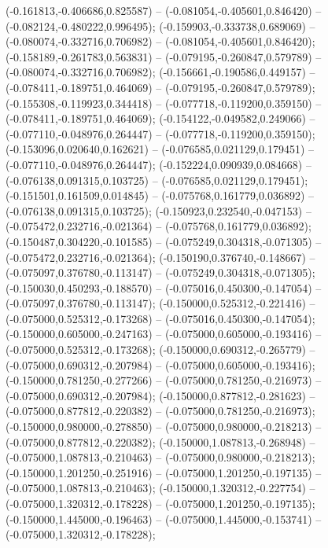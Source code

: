  (-0.161813,-0.406686,0.825587) -- (-0.081054,-0.405601,0.846420) -- (-0.082124,-0.480222,0.996495);
 (-0.159903,-0.333738,0.689069) -- (-0.080074,-0.332716,0.706982) -- (-0.081054,-0.405601,0.846420);
 (-0.158189,-0.261783,0.563831) -- (-0.079195,-0.260847,0.579789) -- (-0.080074,-0.332716,0.706982);
 (-0.156661,-0.190586,0.449157) -- (-0.078411,-0.189751,0.464069) -- (-0.079195,-0.260847,0.579789);
 (-0.155308,-0.119923,0.344418) -- (-0.077718,-0.119200,0.359150) -- (-0.078411,-0.189751,0.464069);
 (-0.154122,-0.049582,0.249066) -- (-0.077110,-0.048976,0.264447) -- (-0.077718,-0.119200,0.359150);
 (-0.153096,0.020640,0.162621) -- (-0.076585,0.021129,0.179451) -- (-0.077110,-0.048976,0.264447);
 (-0.152224,0.090939,0.084668) -- (-0.076138,0.091315,0.103725) -- (-0.076585,0.021129,0.179451);
 (-0.151501,0.161509,0.014845) -- (-0.075768,0.161779,0.036892) -- (-0.076138,0.091315,0.103725);
 (-0.150923,0.232540,-0.047153) -- (-0.075472,0.232716,-0.021364) -- (-0.075768,0.161779,0.036892);
 (-0.150487,0.304220,-0.101585) -- (-0.075249,0.304318,-0.071305) -- (-0.075472,0.232716,-0.021364);
 (-0.150190,0.376740,-0.148667) -- (-0.075097,0.376780,-0.113147) -- (-0.075249,0.304318,-0.071305);
 (-0.150030,0.450293,-0.188570) -- (-0.075016,0.450300,-0.147054) -- (-0.075097,0.376780,-0.113147);
 (-0.150000,0.525312,-0.221416) -- (-0.075000,0.525312,-0.173268) -- (-0.075016,0.450300,-0.147054);
 (-0.150000,0.605000,-0.247163) -- (-0.075000,0.605000,-0.193416) -- (-0.075000,0.525312,-0.173268);
 (-0.150000,0.690312,-0.265779) -- (-0.075000,0.690312,-0.207984) -- (-0.075000,0.605000,-0.193416);
 (-0.150000,0.781250,-0.277266) -- (-0.075000,0.781250,-0.216973) -- (-0.075000,0.690312,-0.207984);
 (-0.150000,0.877812,-0.281623) -- (-0.075000,0.877812,-0.220382) -- (-0.075000,0.781250,-0.216973);
 (-0.150000,0.980000,-0.278850) -- (-0.075000,0.980000,-0.218213) -- (-0.075000,0.877812,-0.220382);
 (-0.150000,1.087813,-0.268948) -- (-0.075000,1.087813,-0.210463) -- (-0.075000,0.980000,-0.218213);
 (-0.150000,1.201250,-0.251916) -- (-0.075000,1.201250,-0.197135) -- (-0.075000,1.087813,-0.210463);
 (-0.150000,1.320312,-0.227754) -- (-0.075000,1.320312,-0.178228) -- (-0.075000,1.201250,-0.197135);
 (-0.150000,1.445000,-0.196463) -- (-0.075000,1.445000,-0.153741) -- (-0.075000,1.320312,-0.178228);
